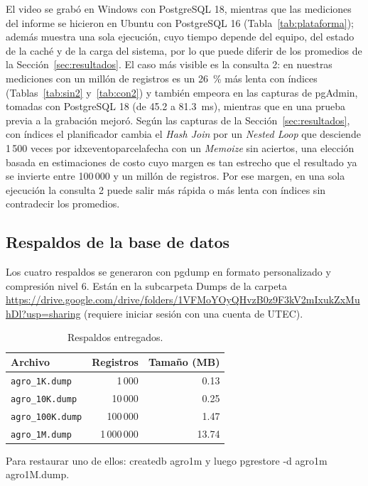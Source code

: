 \documentclass[11pt,letterpaper]{article}
\newcommand{\enlaceDumps}{\url{https://drive.google.com/drive/folders/1VFMoYOyQHvzB0z9F3kV2mIxukZxMuhDl?usp=sharing}}
\newcommand{\tbus}{\textunderscore\allowbreak}
\newcommand{\tb}[1]{{\ttfamily\let\_\tbus #1}}
\begin{document}
El video se grabó en Windows con PostgreSQL 18, mientras que las mediciones del informe se hicieron en Ubuntu con PostgreSQL 16 (Tabla~\ref{tab:plataforma}); además muestra una sola ejecución, cuyo tiempo depende del equipo, del estado de la caché y de la carga del sistema, por lo que puede diferir de los promedios de la Sección~\ref{sec:resultados}. El caso más visible es la consulta 2: en nuestras mediciones con un millón de registros es un 26~\% más lenta con índices (Tablas~\ref{tab:sin2} y~\ref{tab:con2}) y también empeora en las capturas de pgAdmin, tomadas con PostgreSQL 18 (de 45.2 a 81.3~ms), mientras que en una prueba previa a la grabación mejoró. Según las capturas de la Sección~\ref{sec:resultados}, con índices el planificador cambia el \emph{Hash Join} por un \emph{Nested Loop} que desciende 1\,500 veces por \tb{idx\_evento\_parcela\_fecha} con un \emph{Memoize} sin aciertos, una elección basada en estimaciones de costo cuyo margen es tan estrecho que el resultado ya se invierte entre 100\,000 y un millón de registros. Por ese margen, en una sola ejecución la consulta 2 puede salir más rápida o más lenta con índices sin contradecir los promedios.

\subsection{Respaldos de la base de datos}

Los cuatro respaldos se generaron con \tb{pg\_dump} en formato personalizado y compresión nivel 6. Están en la subcarpeta \tb{Dumps} de la carpeta \enlaceDumps{} (requiere iniciar sesión con una cuenta de UTEC).

\begin{table}[H]
\centering\small
\begin{tabular}{lrr}
\toprule
Archivo & Registros & Tamaño (MB) \\
\midrule
\texttt{agro\_1K.dump} & 1\,000 & 0.13 \\
\texttt{agro\_10K.dump} & 10\,000 & 0.25 \\
\texttt{agro\_100K.dump} & 100\,000 & 1.47 \\
\texttt{agro\_1M.dump} & 1\,000\,000 & 13.74 \\
\bottomrule
\end{tabular}
\caption{Respaldos entregados.}\label{tab:dumps}
\end{table}


Para restaurar uno de ellos: \tb{createdb agro1m} y luego \tb{pg\_restore -d agro1m agro\_1M.dump}.
\end{document}
